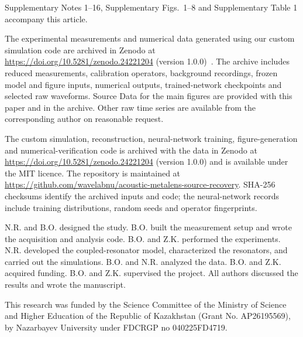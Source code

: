 \documentclass[lineno,pdflatex,sn-nature]{sn-jnl}%
\theoremstyle{thmstyleone}%
\theoremstyle{thmstyletwo}%
\theoremstyle{thmstylethree}%
\begin{document}
\backmatter

\makeatletter
\def\toclevel@subparagraph{1}
\makeatother


Supplementary Notes 1--16, Supplementary Figs.~1--8 and Supplementary Table 1 accompany this article.


The experimental measurements and numerical data generated using our custom simulation code are archived in Zenodo at \url{https://doi.org/10.5281/zenodo.24221204} (version 1.0.0)~\cite{rysmambetov2026data}. The archive includes reduced measurements, calibration operators, background recordings, frozen model and figure inputs, numerical outputs, trained-network checkpoints and selected raw waveforms. Source Data for the main figures are provided with this paper and in the archive. Other raw time series are available from the corresponding author on reasonable request.


The custom simulation, reconstruction, neural-network training, figure-generation and numerical-verification code is archived with the data in Zenodo at \url{https://doi.org/10.5281/zenodo.24221204} (version 1.0.0) and is available under the MIT licence. The repository is maintained at \url{https://github.com/wavelabnu/acoustic-metalens-source-recovery}. SHA-256 checksums identify the archived inputs and code; the neural-network records include training distributions, random seeds and operator fingerprints.


N.R. and B.O. designed the study. B.O. built the measurement setup and wrote the acquisition and analysis code. B.O. and Z.K. performed the experiments. N.R. developed the coupled-resonator model, characterized the resonators, and carried out the simulations. B.O. and N.R. analyzed the data. B.O. and Z.K. acquired funding. B.O. and Z.K. supervised the project. All authors discussed the results and wrote the manuscript.



This research was funded by the Science Committee of the Ministry of Science and Higher Education of the Republic of Kazakhstan (Grant No. AP26195569), by Nazarbayev University under FDCRGP no 040225FD4719.

\end{document}
